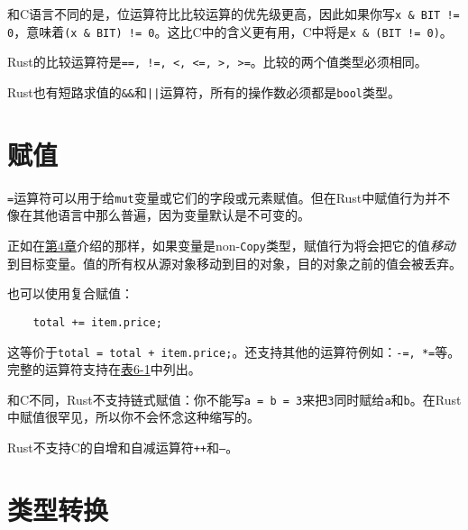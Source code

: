 和C语言不同的是，位运算符比比较运算的优先级更高，因此如果你写\texttt{x \& BIT != 0}，意味着\texttt{(x \& BIT) != 0}。这比C中的含义更有用，C中将是\texttt{x \& (BIT != 0)}。

Rust的比较运算符是\texttt{==, !=, <, <=, >, >=}。比较的两个值类型必须相同。

Rust也有短路求值的\texttt{\&\&}和\texttt{||}运算符，所有的操作数必须都是\texttt{bool}类型。

\section{赋值}

\texttt{=}运算符可以用于给\texttt{mut}变量或它们的字段或元素赋值。但在Rust中赋值行为并不像在其他语言中那么普遍，因为变量默认是不可变的。

正如在\hyperref[ch04]{第4章}介绍的那样，如果变量是non-\texttt{Copy}类型，赋值行为将会把它的值\emph{移动}到目标变量。值的所有权从源对象移动到目的对象，目的对象之前的值会被丢弃。

也可以使用复合赋值：
\begin{verbatim}
    total += item.price;
\end{verbatim}

这等价于\texttt{total = total + item.price;}。还支持其他的运算符例如：\texttt{-=, *=}等。完整的运算符支持在\hyperref[t6-1]{表6-1}中列出。

和C不同，Rust不支持链式赋值：你不能写\texttt{a = b = 3}来把\texttt{3}同时赋给\texttt{a}和\texttt{b}。在Rust中赋值很罕见，所以你不会怀念这种缩写的。

Rust不支持C的自增和自减运算符\texttt{++}和\texttt{--}。

\section{类型转换}\label{cast}

